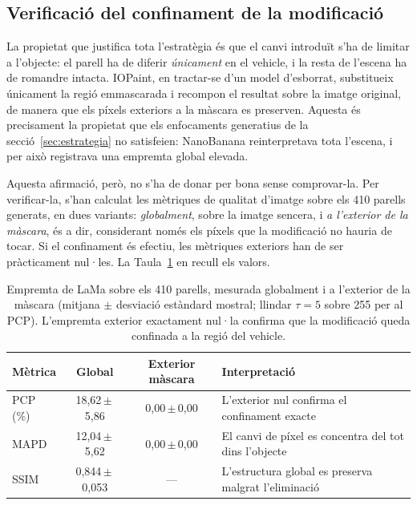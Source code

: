 \subsection{Verificació del confinament de la modificació}
La propietat que justifica tota l'estratègia és que el canvi introduït s'ha de limitar a l'objecte: el parell ha de diferir \emph{únicament} en el vehicle, i la resta de l'escena ha de romandre intacta. IOPaint, en tractar-se d'un model d'esborrat, substitueix únicament la regió emmascarada i recompon el resultat sobre la imatge original, de manera que els píxels exteriors a la màscara es preserven. Aquesta és precisament la propietat que els enfocaments generatius de la secció~\ref{sec:estrategia} no satisfeien: NanoBanana reinterpretava tota l'escena, i per això registrava una empremta global elevada.

Aquesta afirmació, però, no s'ha de donar per bona sense comprovar-la. Per verificar-la, s'han calculat les mètriques de qualitat d'imatge sobre els 410 parells generats, en dues variants: \emph{globalment}, sobre la imatge sencera, i \emph{a l'exterior de la màscara}, és a dir, considerant només els píxels que la modificació no hauria de tocar. Si el confinament és efectiu, les mètriques exteriors han de ser pràcticament nul·les. La Taula~\ref{tab:lama-empremta} en recull els valors.

\begin{table}
\centering
\begin{tabularx}{\textwidth}{@{} l c c X @{}}
\toprule
\textbf{Mètrica} & \textbf{Global} & \textbf{Exterior màscara} & \textbf{Interpretació} \\
\midrule
\acs{PCP} (\%)  & 18,62\,$\pm$\,5,86 & 0,00\,$\pm$\,0,00 & L'exterior nul confirma el confinament exacte \\
\addlinespace
\acs{MAPD}      & 12,04\,$\pm$\,5,62 & 0,00\,$\pm$\,0,00 & El canvi de píxel es concentra del tot dins l'objecte \\
\addlinespace
\acs{SSIM}      & 0,844\,$\pm$\,0,053 & --- & L'estructura global es preserva malgrat l'eliminació \\
\bottomrule
\end{tabularx}
\caption{Empremta de LaMa sobre els 410 parells, mesurada globalment i a l'exterior de la màscara (mitjana $\pm$ desviació estàndard mostral; llindar $\tau = 5$ sobre 255 per al \acs{PCP}). L'empremta exterior exactament nul·la confirma que la modificació queda confinada a la regió del vehicle.}
\label{tab:lama-empremta}
\end{table}

